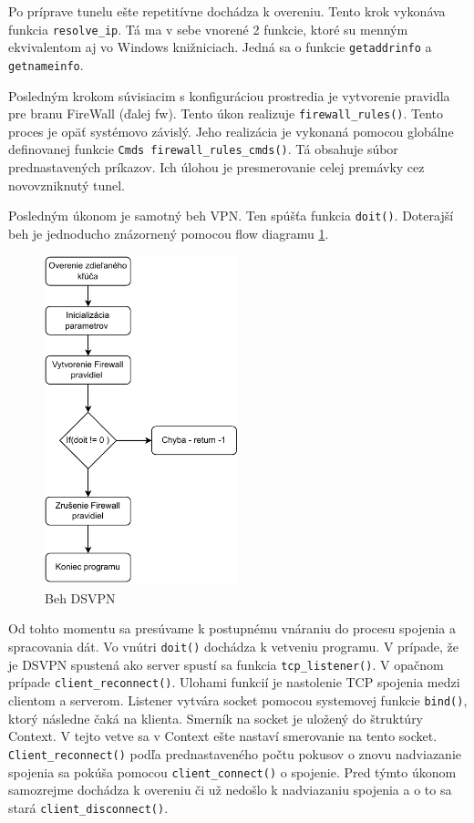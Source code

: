  Po príprave tunelu ešte repetitívne dochádza k overeniu. Tento krok vykonáva funkcia \lstinline|resolve_ip|. Tá ma v sebe vnorené 2 funkcie, ktoré su menným ekvivalentom aj vo Windows knižniciach. Jedná sa o funkcie \lstinline|getaddrinfo| a \lstinline|getnameinfo|.  
 
 Posledným krokom súvisiacim s konfiguráciou prostredia je vytvorenie pravidla pre branu FireWall (ďalej \acrshort{fw}). Tento úkon realizuje \lstinline|firewall_rules()|. Tento proces je opäť systémovo závislý. Jeho realizácia je vykonaná pomocou globálne definovanej funkcie \lstinline|Cmds firewall_rules_cmds()|. Tá obsahuje súbor prednastavených príkazov. Ich úlohou je presmerovanie celej premávky cez novovzniknutý tunel.
 
 Posledným úkonom je samotný beh VPN. Ten spúšťa funkcia \lstinline|doit()|. 
 Doterajší beh je jednoducho znázornený pomocou flow diagramu \ref{fc1}.
 
\begin{figure}
	\centering
	\includegraphics[width=0.5\textwidth]{figures/fc1}
	\caption{Beh DSVPN}
	\label{fc1}
\end{figure}

 Od tohto momentu sa presúvame k postupnému vnáraniu do procesu spojenia a spracovania dát. Vo vnútri \lstinline|doit()| dochádza k vetveniu programu. V prípade, že je DSVPN spustená ako server spustí sa funkcia \lstinline|tcp_listener()|. V opačnom prípade \lstinline|client_reconnect()|. Ulohami funkcií je nastolenie TCP spojenia medzi clientom a serverom. Listener vytvára socket pomocou systemovej funkcie \lstinline|bind()|, ktorý následne čaká na klienta. Smerník na socket je uložený do štruktúry Context. V tejto vetve sa v Context ešte nastaví smerovanie na tento socket. \lstinline|Client_reconnect()| podľa prednastaveného počtu pokusov o znovu nadviazanie spojenia sa pokúša pomocou \lstinline|client_connect()| o spojenie. Pred týmto úkonom samozrejme dochádza k overeniu či už nedošlo k nadviazaniu spojenia a o to sa stará \lstinline|client_disconnect()|.


